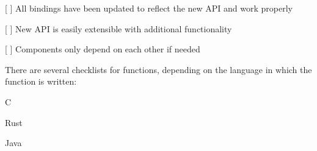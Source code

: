 \begin{DoxyItemize}
\item \mbox{[} \mbox{]} All bindings have been updated to reflect the new A\+PI and work properly
\end{DoxyItemize}


\begin{DoxyItemize}
\item \mbox{[} \mbox{]} New A\+PI is easily extensible with additional functionality
\item \mbox{[} \mbox{]} Components only depend on each other if needed
\end{DoxyItemize}

There are several checklists for functions, depending on the language in which the function is written\+:


\begin{DoxyItemize}
\item C
\item Rust
\item Java 
\end{DoxyItemize}